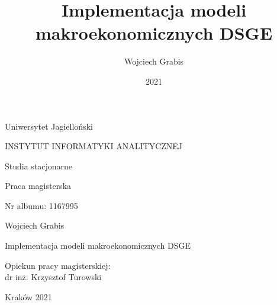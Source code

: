 \documentclass[twoside,a4paper,12pt]{report} %
\title{Implementacja modeli makroekonomicznych DSGE}
\author{Wojciech Grabis}
\date{2021}
\begin{document}
\titleformat{\chapter}[display] {\normalfont\Huge\bfseries}{\chaptertitlename\ \thechapter}{0pt}{\Huge}
\titlespacing{\chapter}{1cm}{2cm}{1cm}

\thispagestyle{empty}
\begin{center}{\sc \large
Uniwersytet Jagielloński\par\vspace{0.2cm}\par}
{\LARGE
INSTYTUT INFORMATYKI ANALITYCZNEJ}\par\vspace{0.2cm}\par
{\large
Studia stacjonarne}\par\vspace{1cm}\par
{\Large
Praca magisterska}%
\end{center}
\vspace{1.5cm}
\begin{flushleft}
{\large
Nr albumu: 1167995}%
\end{flushleft}
\vspace{1.5cm}
\begin{center}
{\LARGE
Wojciech Grabis
}\par\vspace{0.9cm}\par
{\huge
Implementacja modeli makroekonomicznych DSGE
}
\end{center}
\vspace{4cm}
\begin{flushright}

Opiekun pracy magisterskiej:\\
dr inż. Krzysztof Turowski%
\end{flushright}
\vfill
\begin{center}
Kraków 2021%
\end{center}

\leavevmode\thispagestyle{empty}\newpage

\makeatletter
\makeatother
\tableofcontents
\end{document}
